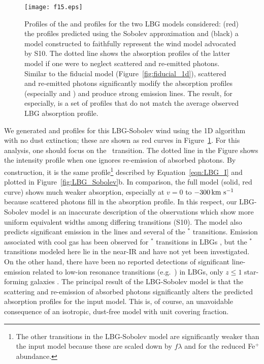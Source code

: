 \documentclass[]{emulateapj}
\begin{document}
\begin{figure}
\texttt{[image: f15.eps]}
\caption{
Profiles of the  and  profiles for the two
LBG models considered: (red) the profiles predicted using the 
Sobolev approximation 
and (black) a model constructed to faithfully
represent the wind model advocated by S10.  The dotted line
shows the absorption profiles of the latter model if one were
to neglect scattered and re-emitted photons.  Similar to the fiducial
model (Figure~\ref{fig:fiducial_1d}), scattered and re-emitted photons
significantly modify the absorption profiles (especially 
and \feiib)
and produce strong emission lines.  
The result, for  especially, is a set of profiles that do
not match the average observed LBG absorption profile.
}
\label{fig:LBG_spec}
\end{figure}


We generated  and  profiles for this LBG-Sobolev
wind
using the 1D algorithm with no dust extinction; these are shown as
red curves in Figure~\ref{fig:LBG_spec}.   For this analysis, one
should focus on the \mgiia\ transition.  The dotted line in the Figure
shows the intensity profile when one ignores re-emission
of absorbed photons.  By construction, it is the same profile\footnote{
  The other transitions in
  the LBG-Sobolev model are significantly weaker than the input model
  because these are scaled down by $f\lambda$ and 
  for  the reduced Fe$^+$ abundance.} 
described by Equation~\ref{eqn:LBG_I} and plotted in
Figure~\ref{fig:LBG_Sobolev}b.   In comparison, the full model (solid,
red curve)
shows much weaker absorption, especially at $v = 0$ to $-300 \, {\rm km~s^{-1}}$
because scattered photons fill in the absorption profile.
In this respect, our LBG-Sobolev model is an
inaccurate description of the observations which show more uniform
equivalent widths among differing transitions (S10). The model
also predicts significant emission in the  lines and several of
the $^*$ transitions.   Emission associated with cool gas
has been observed for $^*$
transitions in LBGs \citep{prs+02,shapley03}, but
the $^*$ transitions
modeled here lie in the near-IR and have not yet been investigated.
On the other hand, there have been no 
reported detections of significant line-emission related to low-ion resonance
transitions (e.g.\ ) in LBGs, only $z \le 1$ star-forming galaxies
\citep{wcp+09,rwk+10}.  
The principal result of the LBG-Sobolev model is that the scattering and re-emission of
absorbed photons significantly alters the predicted absorption profiles
for the input %
model.  This is, of course, an unavoidable
consequence of an isotropic, dust-free model with unit covering
fraction.
\end{document}
